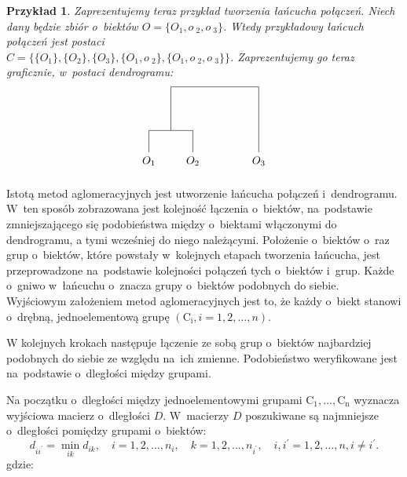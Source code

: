 \documentclass[12pt,a4paper]{report}
\newtheorem{example}{Przykład}
\begin{document}
\begin{example}
Zaprezentujemy teraz przykład tworzenia łańcucha połączeń. Niech dany będzie zbiór o~biektów $O=\{O_1, o~_2, o~_3\}$. Wtedy przykładowy łańcuch połączeń jest postaci \\
$C=\{ \{O_1\}, \{O_2\}, \{O_3\}, \{O_1, o~_2\}, \{O_1, o~_2, o~_3\} \}$. Zaprezentujemy go teraz graficznie, w~postaci dendrogramu: 
$$
\begin{tikzpicture}[scale=.7]
  \node (1) at (0.0,-0.40) {$O_{1}$};
  \node (2) at (2.0,-0.40) {$O_{2}$};
  \node (3) at (5,-0.40) {$O_{3}$}; 
   \draw (0,0)--(0,1); 
   \draw (0,1)--(2,1);
   \draw (2,0)--(2,1);
   \draw (1,1)--(1,3);
   \draw (1,3)--(5,3);
   \draw (5,0)--(5,3);
\end{tikzpicture}
$$ 
\end{example}



Istotą metod aglomeracyjnych jest utworzenie łańcucha połączeń i~dendrogramu. W~ten sposób zobrazowana jest kolejność łączenia o~biektów, na~podstawie zmniejszającego się podobieństwa między o~biektami włączonymi do dendrogramu, a tymi wcześniej do niego należącymi. Położenie o~biektów o~raz grup o~biektów, które powstały w~kolejnych etapach tworzenia łańcucha, jest przeprowadzone na~podstawie kolejności połączeń tych o~biektów i~grup. Każde o~gniwo w~łańcuchu o~znacza grupy o~biektów podobnych do siebie. 
Wyjściowym założeniem metod aglomeracyjnych jest to, że każdy o~biekt stanowi o~drębną, jednoelementową grupę $(\mathrm{C_{i}}, i=1,2,\dots,n)$.

W kolejnych krokach następuje łączenie ze sobą grup o~biektów najbardziej podobnych do siebie ze względu na~ich zmienne. Podobieństwo weryfikowane jest na~podstawie o~dległości między grupami.  %

Na początku o~dległości między jednoelementowymi grupami $\mathrm{C_{1}},\dots,\mathrm{C_{n}}$ wyznacza wyjściowa macierz o~dległości $D$. W~macierzy $D$ poszukiwane są najmniejsze o~dległości pomiędzy grupami o~biektów:
$$
d_{ii^{'}}= \min\limits_{ik} {d_{ik}}, \quad i=1,2,\dots,n_{i}, \quad k=1,2,\dots,n_{i^{'}}, \quad i,i^{'}=1,2,\dots,n, i\neq i^{'}.
$$
gdzie:
\end{document}
